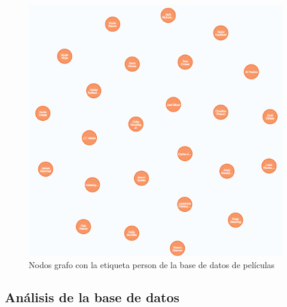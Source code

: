 \begin{figure}[H]
    \centering
    \includegraphics[scale=0.8]{Graficos/graph3.png}
    \caption{Nodos grafo con la etiqueta person de la base de datos de películas}
    \label{fig:graph_3}
\end{figure}
\subsection{Análisis de la base de datos}
